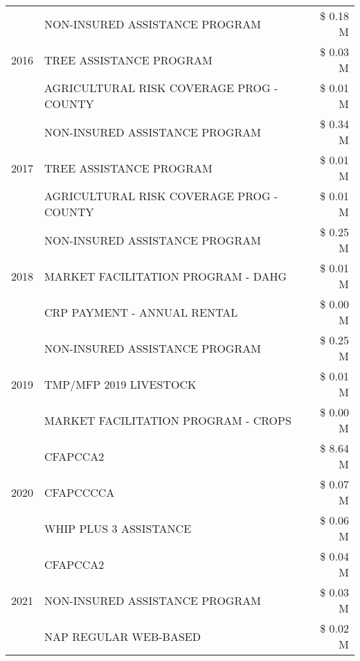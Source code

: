 \begin{tabular}{llr}
\cline{1-3}
\multirow[t]{3}{*}{2016} & NON-INSURED ASSISTANCE PROGRAM & \$ 0.18 M \\
 & TREE ASSISTANCE PROGRAM & \$ 0.03 M \\
 & AGRICULTURAL RISK COVERAGE PROG - COUNTY & \$ 0.01 M \\
\cline{1-3}
\multirow[t]{3}{*}{2017} & NON-INSURED ASSISTANCE PROGRAM & \$ 0.34 M \\
 & TREE ASSISTANCE PROGRAM & \$ 0.01 M \\
 & AGRICULTURAL RISK COVERAGE PROG - COUNTY & \$ 0.01 M \\
\cline{1-3}
\multirow[t]{3}{*}{2018} & NON-INSURED ASSISTANCE PROGRAM & \$ 0.25 M \\
 & MARKET FACILITATION PROGRAM - DAHG & \$ 0.01 M \\
 & CRP PAYMENT - ANNUAL RENTAL & \$ 0.00 M \\
\cline{1-3}
\multirow[t]{3}{*}{2019} & NON-INSURED ASSISTANCE PROGRAM & \$ 0.25 M \\
 & TMP/MFP 2019 LIVESTOCK & \$ 0.01 M \\
 & MARKET FACILITATION PROGRAM - CROPS & \$ 0.00 M \\
\cline{1-3}
\multirow[t]{3}{*}{2020} & CFAPCCA2 & \$ 8.64 M \\
 & CFAPCCCCA & \$ 0.07 M \\
 & WHIP PLUS 3 ASSISTANCE & \$ 0.06 M \\
\cline{1-3}
\multirow[t]{3}{*}{2021} & CFAPCCA2 & \$ 0.04 M \\
 & NON-INSURED ASSISTANCE PROGRAM & \$ 0.03 M \\
 & NAP REGULAR WEB-BASED & \$ 0.02 M \\
\cline{1-3}
\bottomrule
\end{tabular}
